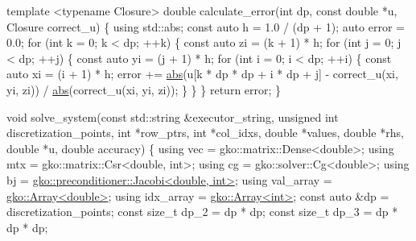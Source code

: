 \begin{DoxyCodeInclude}
\textcolor{keyword}{template} <\textcolor{keyword}{typename} Closure>
\textcolor{keywordtype}{double} calculate\_error(\textcolor{keywordtype}{int} dp, \textcolor{keyword}{const} \textcolor{keywordtype}{double} *u, Closure correct\_u)
\{
    \textcolor{keyword}{using} std::abs;
    \textcolor{keyword}{const} \textcolor{keyword}{auto} h = 1.0 / (dp + 1);
    \textcolor{keyword}{auto} error = 0.0;
    \textcolor{keywordflow}{for} (\textcolor{keywordtype}{int} k = 0; k < dp; ++k) \{
        \textcolor{keyword}{const} \textcolor{keyword}{auto} zi = (k + 1) * h;
        \textcolor{keywordflow}{for} (\textcolor{keywordtype}{int} j = 0; j < dp; ++j) \{
            \textcolor{keyword}{const} \textcolor{keyword}{auto} yi = (j + 1) * h;
            \textcolor{keywordflow}{for} (\textcolor{keywordtype}{int} i = 0; i < dp; ++i) \{
                \textcolor{keyword}{const} \textcolor{keyword}{auto} xi = (i + 1) * h;
                error +=
                    \hyperlink{namespacegko_a57797fc0a00fd4b7ff34ca4bfc84bc51}{abs}(u[k * dp * dp + i * dp + j] - correct\_u(xi, yi, zi)) /
                    \hyperlink{namespacegko_a57797fc0a00fd4b7ff34ca4bfc84bc51}{abs}(correct\_u(xi, yi, zi));
            \}
        \}
    \}
    \textcolor{keywordflow}{return} error;
\}


\textcolor{keywordtype}{void} solve\_system(\textcolor{keyword}{const} std::string &executor\_string,
                  \textcolor{keywordtype}{unsigned} \textcolor{keywordtype}{int} discretization\_points, \textcolor{keywordtype}{int} *row\_ptrs,
                  \textcolor{keywordtype}{int} *col\_idxs, \textcolor{keywordtype}{double} *values, \textcolor{keywordtype}{double} *rhs, \textcolor{keywordtype}{double} *u,
                  \textcolor{keywordtype}{double} accuracy)
\{
    \textcolor{keyword}{using} vec = gko::matrix::Dense<double>;
    \textcolor{keyword}{using} mtx = gko::matrix::Csr<double, int>;
    \textcolor{keyword}{using} cg = gko::solver::Cg<double>;
    \textcolor{keyword}{using} bj = \hyperlink{classgko_1_1preconditioner_1_1Jacobi}{gko::preconditioner::Jacobi<double, int>};
    \textcolor{keyword}{using} val\_array = \hyperlink{classgko_1_1Array}{gko::Array<double>};
    \textcolor{keyword}{using} idx\_array = \hyperlink{classgko_1_1Array}{gko::Array<int>};
    \textcolor{keyword}{const} \textcolor{keyword}{auto} &dp = discretization\_points;
    \textcolor{keyword}{const} \textcolor{keywordtype}{size\_t} dp\_2 = dp * dp;
    \textcolor{keyword}{const} \textcolor{keywordtype}{size\_t} dp\_3 = dp * dp * dp;


\end{DoxyCodeInclude}
